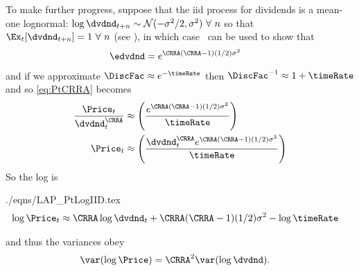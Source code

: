 \documentclass{handout}
\begin{document}
To make further progress, suppose that the iid process for dividends is a mean-one lognormal: $\log \dvdnd_{t+n} \sim \mathcal{N}(-\sigma^{2}/2,\sigma^{2})~\forall~n$ so that $\Ex_{t}[\dvdnd_{t+n}]=1~\forall~n$ (see \ELogNormMeanOne), in which case \ELogNormTimes~can be used to show that
\begin{equation}\begin{gathered}\begin{aligned}
 \edvdnd & =  e^{\CRRA(\CRRA-1)(1/2)\sigma^{2}} \label{eq:edvdndSimple}
\end{aligned}\end{gathered}\end{equation}
and if we approximate $\DiscFac \approx e^{-\timeRate}$ then $\DiscFac^{-1} \approx 1+\timeRate$ and so \eqref{eq:PtCRRA} becomes
\begin{equation*}\begin{gathered}\begin{aligned}
  \frac{\Price_{t}}{\dvdnd_{t}^{\CRRA}} %
 & \approx  \left(\frac{e^{\CRRA(\CRRA-1)(1/2)\sigma^{2}}}{\timeRate}\right)
\\ \Price_{t} & \approx  \left(\frac{\dvdnd_{t}^{\CRRA} e^{\CRRA(\CRRA-1)(1/2)\sigma^{2}}}{\timeRate}\right)
\end{aligned}\end{gathered}\end{equation*}
So the log is
\begin{verbatimwrite}{./eqns/LAP_PtLogIID.tex}
\begin{equation}\begin{gathered}\begin{aligned}
  \log \Price_{t} & \approx  \CRRA \log \dvdnd_{t} + \CRRA(\CRRA-1)(1/2)\sigma^{2} - \log \timeRate \label{eq:PtLogIID}
\end{aligned}\end{gathered}\end{equation}
\end{verbatimwrite}

and thus the variances obey
\begin{equation}\begin{gathered}\begin{aligned}
  \label{eq:varLogPvsLogd}
  \var({\log \Price}) & =  \CRRA^{2} \var(\log \dvdnd)
.
\end{aligned}\end{gathered}\end{equation}
\end{document}
